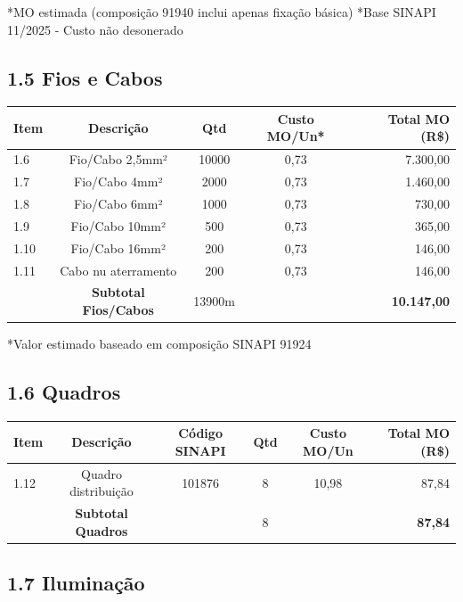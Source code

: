 \documentclass[12pt,a4paper]{article}
\renewenvironment{table}%
{\begin{center}%
\scriptsize%
\addtolength{\tabcolsep}{-2pt}%
}%
{\end{center}}
\begin{document}
\noindent\small{*MO estimada (composição 91940 inclui apenas fixação básica)}
\noindent\small{*Base SINAPI 11/2025 - Custo não desonerado}

\subsection{1.5 Fios e Cabos}

\begin{table}
\centering
\begin{tabular}{lcccr}
\toprule
\textbf{Item} & \textbf{Descrição} & \textbf{Qtd} & \textbf{Custo MO/Un*} & \textbf{Total MO (R\$)} \\
\midrule
1.6 & Fio/Cabo 2,5mm² & 10000 & 0,73 & 7.300,00 \\
1.7 & Fio/Cabo 4mm² & 2000 & 0,73 & 1.460,00 \\
1.8 & Fio/Cabo 6mm² & 1000 & 0,73 & 730,00 \\
1.9 & Fio/Cabo 10mm² & 500 & 0,73 & 365,00 \\
1.10 & Fio/Cabo 16mm² & 200 & 0,73 & 146,00 \\
1.11 & Cabo nu aterramento & 200 & 0,73 & 146,00 \\
\midrule
 & \textbf{Subtotal Fios/Cabos} & 13900m & & \textbf{10.147,00} \\
\bottomrule
\end{tabular}
\end{table}

\noindent\small{*Valor estimado baseado em composição SINAPI 91924}

\pagebreak

\subsection{1.6 Quadros}

\begin{table}
\centering
\begin{tabular}{lccccr}
\toprule
\textbf{Item} & \textbf{Descrição} & \textbf{Código SINAPI} & \textbf{Qtd} & \textbf{Custo MO/Un} & \textbf{Total MO (R\$)} \\
\midrule
1.12 & Quadro distribuição & 101876 & 8 & 10,98 & 87,84 \\
\midrule
 & \textbf{Subtotal Quadros} & & 8 & & \textbf{87,84} \\
\bottomrule
\end{tabular}
\end{table}

\subsection{1.7 Iluminação}
\end{document}
